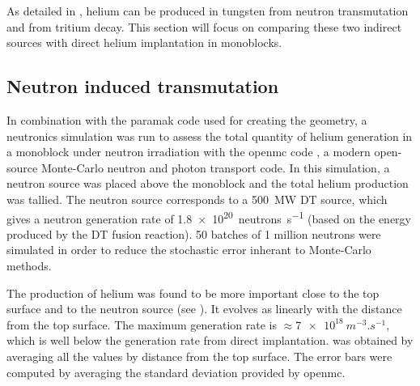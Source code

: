 As detailed in , helium can be produced in tungsten from neutron \gls{transmutation} and from tritium decay.
This section will focus on comparing these two indirect sources with direct helium implantation in monoblocks.

\subsection{Neutron induced transmutation}

In combination with the \gls{paramak} code  used for creating the geometry, a neutronics simulation was run to assess the total quantity of helium generation in a monoblock under neutron irradiation with the \gls{openmc} code , a modern open-source Monte-Carlo neutron and photon transport code.
In this simulation, a neutron source was placed above the monoblock and the total helium production was tallied.
The neutron source corresponds to a \SI{500}{MW} DT source, which gives a neutron generation rate of \SI{1.8e20}{neutrons.s^{-1}} (based on the energy produced by the DT fusion reaction).
50 batches of 1 million neutrons were simulated in order to reduce the stochastic error inherant to Monte-Carlo methods.

The production of helium was found to be more important close to the top surface and to the neutron source (see ).
It evolves as linearly with the distance from the top surface.
The maximum generation rate is $\approx \SI{7e18}{m^{-3}.s^{-1}}$, which is well below the generation rate from direct implantation.
 was obtained by averaging all the values by distance from the top surface.
The error bars were computed by averaging the standard deviation provided by \gls{openmc}.

